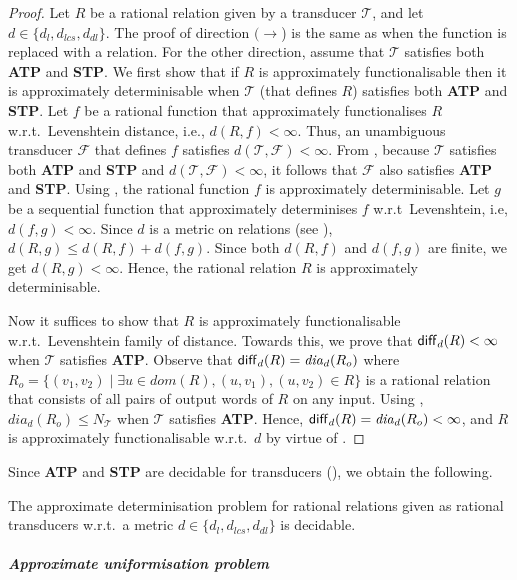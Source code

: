 \documentclass[a4paper,UKenglish,cleveref, autoref, thm-restate,authorcolumns, colorlinks]{lipics-v2021}
\newcommand\dom{\mathit{dom}}
\newcommand\calF{\mathcal{F}}
\newcommand\calT{\mathcal{T}}
\newcommand\dia[2]{\ensuremath{\mathit{dia}_{#2}(#1)}}
\newcommand{\ATP}[0]{\textbf{ATP}}
\newcommand{\STP}[0]{\textbf{STP}}
\begin{document}
{\begin{proof}
    Let $R$ be a rational relation given by a transducer $\calT$, and let $d \in \{d_l,d_{lcs},d_{dl}\}$. The proof of direction $(\rightarrow$) is the same as  when the function is replaced with a relation.
    For the other direction, assume that $\calT$ satisfies both \ATP{} and \STP{}. We first show that if $R$ is approximately functionalisable then it is approximately determinisable when $\calT$ (that defines $R$) satisfies both \ATP{} and \STP{}. Let $f$ be a rational function that approximately functionalises $R$ w.r.t.~Levenshtein distance, i.e., $d(R,f) < \infty$. Thus, an unambiguous transducer $\calF$ that defines $f$ satisfies $d(\calT,\calF) < \infty$. From , because $\calT$ satisfies both \ATP{} and \STP{} and $d(\calT,\calF) < \infty$, it follows that $\calF$ also satisfies \ATP{} and \STP{}. Using , the rational function $f$ is approximately determinisable. Let $g$ be a sequential function that approximately determinises $f$ w.r.t~Levenshtein, i.e, $d(f,g) < \infty$. Since $d$ is a metric on relations (see ), $d(R,g) \leq d(R,f) + d(f,g)$. Since both $d(R,f)$ and $d(f,g)$ are finite, we get $d(R,g) < \infty$. Hence, the rational relation $R$ is approximately determinisable.
    
    
    Now it suffices to show that $R$ is approximately functionalisable w.r.t.~Levenshtein family of distance. Towards this, we prove that ${\sf diff}_{d}(R) < \infty$ when $\calT$ satisfies \ATP{}. Observe that ${\sf diff}_{d}(R) = \dia{R_o}{d}$ where $R_o = \{(v_1,v_2) \mid \exists u \in \dom(R),(u,v_1),(u,v_2)\in R\}$ is a rational relation that consists of all pairs of output words of $R$ on any input. Using , $\dia{R_o}{d} \leq N_\calT$ when $\calT$ satisfies \ATP{}. Hence,  ${\sf diff}_{d}(R) = \dia{R_o}{d} < \infty$, and $R$ is approximately functionalisable w.r.t.~$d$ by virtue of . \qedhere
    
\end{proof}
Since \ATP{} and \STP{} are decidable for transducers (), we obtain the following.
\begin{theorem}
    The approximate determinisation problem for rational relations given as rational transducers w.r.t.~a metric $d \in \{d_l,d_{lcs},d_{dl}\}$ is decidable.
\end{theorem}
\subparagraph{Approximate uniformisation problem}

}
\end{document}
